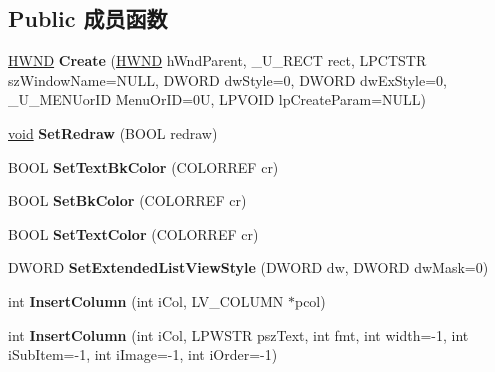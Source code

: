 \subsection*{Public 成员函数}
\begin{DoxyCompactItemize}
\item 
\mbox{\label{class_c_list_view_af066ffa57bd1894d704735108b2b8248}} 
\hyperlink{interfacevoid}{H\+W\+ND} {\bfseries Create} (\hyperlink{interfacevoid}{H\+W\+ND} h\+Wnd\+Parent, \+\_\+\+U\+\_\+\+R\+E\+CT rect, L\+P\+C\+T\+S\+TR sz\+Window\+Name=N\+U\+LL, D\+W\+O\+RD dw\+Style=0, D\+W\+O\+RD dw\+Ex\+Style=0, \+\_\+\+U\+\_\+\+M\+E\+N\+Uor\+ID Menu\+Or\+ID=0\+U, L\+P\+V\+O\+I\+D lp\+Create\+Param=\+N\+U\+L\+L)
\item 
\mbox{\label{class_c_list_view_a301fbaf3b9675cf232b5356c0566ba75}} 
\hyperlink{interfacevoid}{void} {\bfseries Set\+Redraw} (B\+O\+OL redraw)
\item 
\mbox{\label{class_c_list_view_a0df9888e6e88adb5ab11aef43ee2d46c}} 
B\+O\+OL {\bfseries Set\+Text\+Bk\+Color} (C\+O\+L\+O\+R\+R\+EF cr)
\item 
\mbox{\label{class_c_list_view_adda3cf0e7eaec13157658530e3330866}} 
B\+O\+OL {\bfseries Set\+Bk\+Color} (C\+O\+L\+O\+R\+R\+EF cr)
\item 
\mbox{\label{class_c_list_view_a58e3ccfa2b0e788eaa5952b2693ba9e9}} 
B\+O\+OL {\bfseries Set\+Text\+Color} (C\+O\+L\+O\+R\+R\+EF cr)
\item 
\mbox{\label{class_c_list_view_a2d966c83d7035c1050251e2c6bfbc8dd}} 
D\+W\+O\+RD {\bfseries Set\+Extended\+List\+View\+Style} (D\+W\+O\+RD dw, D\+W\+O\+RD dw\+Mask=0)
\item 
\mbox{\label{class_c_list_view_a61e0bf86a8c39916beae36c69ecd58f2}} 
int {\bfseries Insert\+Column} (int i\+Col, L\+V\+\_\+\+C\+O\+L\+U\+MN $\ast$pcol)
\item 
\mbox{\label{class_c_list_view_a6c6932e9fa2412875ac4142fba788af2}} 
int {\bfseries Insert\+Column} (int i\+Col, L\+P\+W\+S\+TR psz\+Text, int fmt, int width=-\/1, int i\+Sub\+Item=-\/1, int i\+Image=-\/1, int i\+Order=-\/1)

\end{DoxyCompactItemize}

